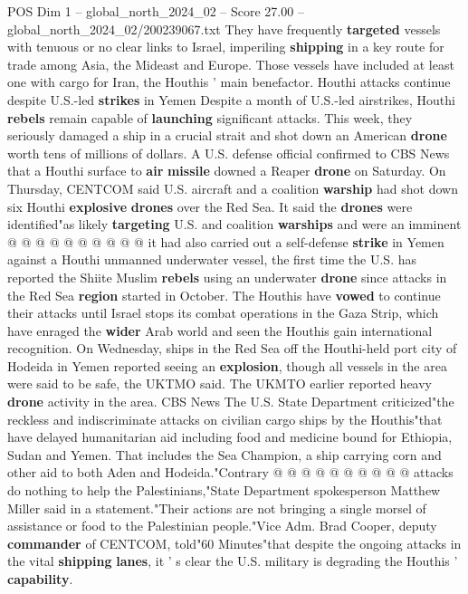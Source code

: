 \begin{textsample}{POS Dim 1 – global\_north\_2024\_02 – Score 27.00 – global\_north\_2024\_02/200239067.txt}
They have frequently \textbf{targeted} vessels with tenuous or no clear links to Israel, imperiling \textbf{shipping} in a key route for trade among Asia, the Mideast and Europe.
Those vessels have included at least one with cargo for Iran, the Houthis ' main benefactor.
Houthi attacks continue despite U.S.-led \textbf{strikes} in Yemen Despite a month of U.S.-led airstrikes, Houthi \textbf{rebels} remain capable of \textbf{launching} significant attacks.
This week, they seriously damaged a ship in a crucial strait and shot down an American \textbf{drone} worth tens of millions of dollars.
A U.S. defense official confirmed to CBS News that a Houthi surface to \textbf{air} \textbf{missile} downed a Reaper \textbf{drone} on Saturday.
On Thursday, CENTCOM said U.S. aircraft and a coalition \textbf{warship} had shot down six Houthi \textbf{explosive} \textbf{drones} over the Red Sea.
It said the \textbf{drones} were identified"as likely \textbf{targeting} U.S. and coalition \textbf{warships} and were an imminent @ @ @ @ @ @ @ @ @ @ it had also carried out a self-defense \textbf{strike} in Yemen against a Houthi unmanned underwater vessel, the first time the U.S. has reported the Shiite Muslim \textbf{rebels} using an underwater \textbf{drone} since attacks in the Red Sea \textbf{region} started in October.
The Houthis have \textbf{vowed} to continue their attacks until Israel stops its combat operations in the Gaza Strip, which have enraged the \textbf{wider} Arab world and seen the Houthis gain international recognition.
On Wednesday, ships in the Red Sea off the Houthi-held port city of Hodeida in Yemen reported seeing an \textbf{explosion}, though all vessels in the area were said to be safe, the UKTMO said.
The UKMTO earlier reported heavy \textbf{drone} activity in the area.
CBS News The U.S.
State Department criticized"the reckless and indiscriminate attacks on civilian cargo ships by the Houthis"that have delayed humanitarian aid including food and medicine bound for Ethiopia, Sudan and Yemen.
That includes the Sea Champion, a ship carrying corn and other aid to both Aden and Hodeida."Contrary @ @ @ @ @ @ @ @ @ @ attacks do nothing to help the Palestinians,"State Department spokesperson Matthew Miller said in a statement."Their actions are not bringing a single morsel of assistance or food to the Palestinian people."Vice Adm.
Brad Cooper, deputy \textbf{commander} of CENTCOM, told"60 Minutes"that despite the ongoing attacks in the vital \textbf{shipping} \textbf{lanes}, it ' s clear the U.S. military is degrading the Houthis ' \textbf{capability}.

\end{textsample}
